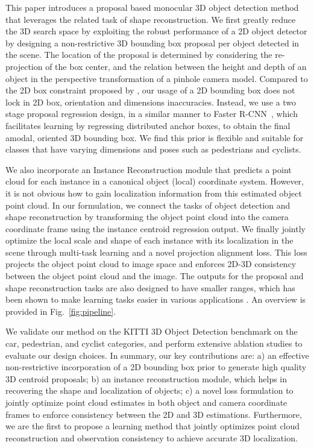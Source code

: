 \documentclass[10pt,twocolumn,letterpaper]{article}
\begin{document}
	This paper introduces a proposal based monocular 3D object detection method that leverages the related task of shape reconstruction. We first greatly reduce the 3D search space by exploiting the robust performance of a 2D object detector by designing a non-restrictive 3D bounding box proposal per object detected in the scene. The location of the proposal is determined by considering the re-projection of the box center, and the relation between the height and depth of an object in the perspective transformation of a pinhole camera model. Compared to the 2D box constraint proposed by \cite{mousavian_deep3dbox}, our usage of a 2D bounding box does not lock in 2D box, orientation and dimensions inaccuracies. Instead, we use a two stage proposal regression design, in a similar manner to Faster R-CNN~\cite{ren_fasterrcnn}, which facilitates learning by regressing distributed anchor boxes, to obtain the final amodal, oriented 3D bounding box. We find this prior is flexible and suitable for classes that have varying dimensions and poses such as pedestrians and cyclists.
	
	We also incorporate an Instance Reconstruction module that predicts a point cloud for each instance in a canonical object (local) coordinate system. However, it is not obvious how to gain localization information from this estimated object point cloud. In our formulation, we connect the tasks of object detection and shape reconstruction by transforming the object point cloud into the camera coordinate frame using the instance centroid regression output. We finally jointly optimize the local scale and shape of each instance with its localization in the scene through multi-task learning and a novel projection alignment loss. This loss projects the object point cloud to image space and enforces 2D-3D consistency between the object point cloud and the image. The outputs for the proposal and shape reconstruction tasks are also designed to have smaller ranges, which has been shown to make learning tasks easier in various applications \cite{mousavian_deep3dbox, qi_fpointnet, ren_fasterrcnn}. An overview is provided in Fig.~\ref{fig:pipeline}.
	
	We validate our method on the KITTI 3D Object Detection benchmark \cite{geiger_kitti} on the car, pedestrian, and cyclist categories, and perform extensive ablation studies to evaluate our design choices. In summary, our key contributions are: a) an effective non-restrictive incorporation of a 2D bounding box prior to generate high quality 3D centroid proposals; b) an instance reconstruction module, which helps in recovering the shape and localization of objects; c) a novel loss formulation to jointly optimize point cloud estimates in both object and camera coordinate frames to enforce consistency between the 2D and 3D estimations. Furthermore, we are the first to propose a learning method that jointly optimizes point cloud reconstruction and observation consistency to achieve accurate 3D localization.
	
\end{document}
